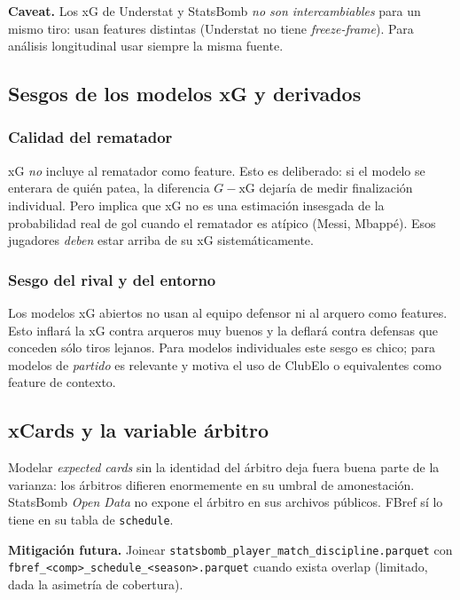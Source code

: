\textbf{Caveat.} Los xG de Understat y StatsBomb \emph{no son intercambiables} para un mismo tiro: usan features distintas (Understat no tiene \emph{freeze-frame}). Para análisis longitudinal usar siempre la misma fuente.

\subsection{Sesgos de los modelos xG y derivados}

\subsubsection{Calidad del rematador}

xG \emph{no} incluye al rematador como feature. Esto es deliberado: si el modelo se enterara de quién patea, la diferencia $G - \mathrm{xG}$ dejaría de medir finalización individual. Pero implica que xG no es una estimación insesgada de la probabilidad real de gol cuando el rematador es atípico (Messi, Mbappé). Esos jugadores \emph{deben} estar arriba de su xG sistemáticamente.

\subsubsection{Sesgo del rival y del entorno}

Los modelos xG abiertos no usan al equipo defensor ni al arquero como features. Esto inflará la xG contra arqueros muy buenos y la deflará contra defensas que conceden sólo tiros lejanos. Para modelos individuales este sesgo es chico; para modelos de \emph{partido} es relevante y motiva el uso de ClubElo o equivalentes como feature de contexto.

\subsection{xCards y la variable árbitro}

Modelar \emph{expected cards} sin la identidad del árbitro deja fuera buena parte de la varianza: los árbitros difieren enormemente en su umbral de amonestación. StatsBomb \emph{Open Data} no expone el árbitro en sus archivos públicos. FBref sí lo tiene en su tabla de \texttt{schedule}.

\textbf{Mitigación futura.} Joinear \texttt{statsbomb\_player\_match\_discipline.parquet} con \texttt{fbref\_<comp>\_schedule\_<season>.parquet} cuando exista overlap (limitado, dada la asimetría de cobertura).

